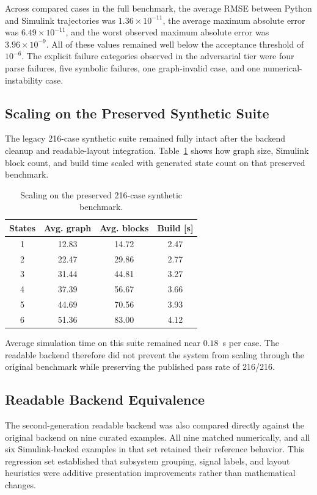 \documentclass[colorlinks,upint,subscriptcorrection,varvw,balance,nofoot]{asmeconf}
\begin{document}
Across compared cases in the full benchmark, the average RMSE between Python and Simulink trajectories was $1.36\times10^{-11}$, the average maximum absolute error was $6.49\times10^{-11}$, and the worst observed maximum absolute error was $3.96\times10^{-9}$. All of these values remained well below the acceptance threshold of $10^{-6}$. The explicit failure categories observed in the adversarial tier were four parse failures, five symbolic failures, one graph-invalid case, and one numerical-instability case.

\subsection{Scaling on the Preserved Synthetic Suite}
The legacy 216-case synthetic suite remained fully intact after the backend cleanup and readable-layout integration. Table~\ref{tab:scaling} shows how graph size, Simulink block count, and build time scaled with generated state count on that preserved benchmark.

\begin{table}[t]
\caption{Scaling on the preserved 216-case synthetic benchmark.}
\label{tab:scaling}
\centering
\footnotesize
\begin{tabularx}{\columnwidth}{@{}c c c c@{}}
\toprule
States & Avg. graph & Avg. blocks & Build [s] \\
\midrule
1 & 12.83 & 14.72 & 2.47 \\
2 & 22.47 & 29.86 & 2.77 \\
3 & 31.44 & 44.81 & 3.27 \\
4 & 37.39 & 56.67 & 3.66 \\
5 & 44.69 & 70.56 & 3.93 \\
6 & 51.36 & 83.00 & 4.12 \\
\bottomrule
\end{tabularx}
\end{table}

Average simulation time on this suite remained near $0.18$~s per case. The readable backend therefore did not prevent the system from scaling through the original benchmark while preserving the published pass rate of 216/216.

\subsection{Readable Backend Equivalence}
The second-generation readable backend was also compared directly against the original backend on nine curated examples. All nine matched numerically, and all six Simulink-backed examples in that set retained their reference behavior. This regression set established that subsystem grouping, signal labels, and layout heuristics were additive presentation improvements rather than mathematical changes.
\end{document}
